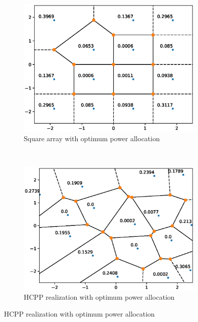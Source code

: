 \documentclass{beamer}
\theoremstyle{remark}
\begin{document}
\begin{frame}
\begin{figure}[!]
\centering
\begin{subfigure}{0.5\columnwidth}
\includegraphics[width=\columnwidth]{sqarr_pwr}
\caption{Square array with optimum power allocation}
\end{subfigure}~
\begin{subfigure}{0.485\columnwidth}
\includegraphics[width=\columnwidth]{hcpp_pwr}
\caption{HCPP realization with optimum power allocation}
\end{subfigure}
\label{fig:SNR_profiles}
\end{figure}
\end{frame}
\end{document}
